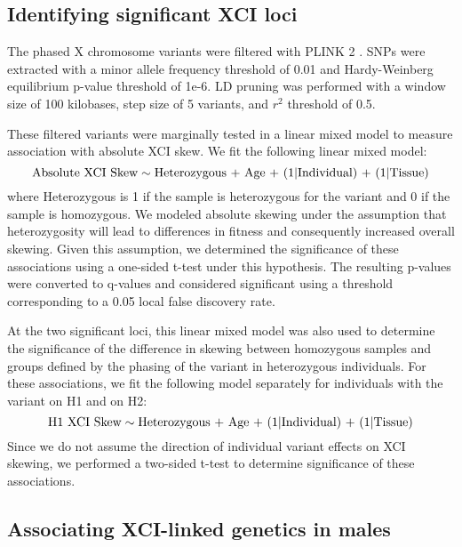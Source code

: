 \subsection{Identifying significant XCI loci}

The phased X chromosome variants were filtered with PLINK 2 \cite{PLINK2}. SNPs were extracted with a minor allele frequency threshold of 0.01 and Hardy-Weinberg equilibrium p-value threshold of 1e-6. LD pruning was performed with a window size of 100 kilobases, step size of 5 variants, and $r^2$ threshold of 0.5. 

These filtered variants were marginally tested in a linear mixed model to measure association with absolute XCI skew. We fit the following linear mixed model:
\begin{equation}
\text{Absolute XCI Skew} \sim \text{Heterozygous + Age + (1\textbar Individual) + (1\textbar Tissue)}
\end{equation}
where Heterozygous is 1 if the sample is heterozygous for the variant and 0 if the sample is homozygous. We modeled absolute skewing under the assumption that heterozygosity will lead to differences in fitness and consequently increased overall skewing. Given this assumption, we determined the significance of these associations using a one-sided t-test under this hypothesis. The resulting p-values were converted to q-values \cite{Storey2003-kx} and considered significant using a threshold corresponding to a 0.05 local false discovery rate.

At the two significant loci, this linear mixed model was also used to determine the significance of the difference in skewing between homozygous samples and groups defined by the phasing of the variant in heterozygous individuals. For these associations, we fit the following model separately for individuals with the variant on H1 and on H2:
\begin{equation}
\text{H1 XCI Skew} \sim \text{Heterozygous + Age + (1\textbar Individual) + (1\textbar Tissue)}
\end{equation}
Since we do not assume the direction of individual variant effects on XCI skewing, we performed a two-sided t-test to determine significance of these associations. 

\subsection{Associating XCI-linked genetics in males}

